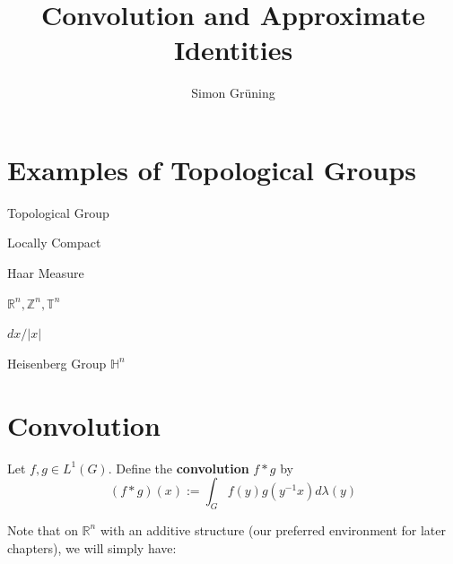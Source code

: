 


\title{Convolution and Approximate Identities}
\author{Simon Gr\"uning}
\address[Simon Gr\"uning]{University of Zurich, R\"{a}mistrasse 71, 8006 Zurich}



\maketitle
\addtocounter{section}{1}

\section{Examples of Topological Groups}



\begin{definition}
Topological Group
\end{definition}

\begin{definition}
Locally Compact
\end{definition}

\begin{definition}
Haar Measure
\end{definition}

	\begin{example}
	$\mathbb{R}^n, \mathbb{Z}^n, \mathbb{T}^n$
	\end{example}
	
\begin{example}
$dx/|x|$
\end{example}	
	
\begin{example}
Heisenberg Group $\mathbb{H}^n$
\end{example}	

	
\section{Convolution}

\begin{definition}
 Let $f,g \in L^1(G)$. Define the \textbf{convolution} $f*g$ by
\begin{equation}
 (f*g)(x) := \int_G f(y)g(y^{-1}x) d\lambda(y)
\end{equation}
\end{definition}

Note that on $\mathbb{R}^n$ with an additive structure (our preferred environment for later chapters), we will simply have:

